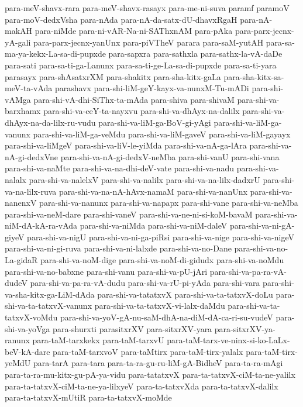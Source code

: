 {para-meV-shavx-rara
para-meV-shavx-rasayx
para-me-ni-suva
paramf
paramoV
para-moV-dedxVsha
para-nAda
para-nA-da-satx-dU-dhavxRgaH
para-nA-makAH
para-niMde
para-ni-vAR-Na-ni-SAThxnAM
para-pAka
para-parx-jecnx-yA-gali
para-parx-jecnx-yanUnx
para-piVTheV
parara
para-saM-yutAH
para-sa-ma-ya-kekx-La-sa-di-pupxde
para-sapxra
para-sathxla
para-sathx-la-vA-daDe
para-sati
para-sa-ti-ga-Lanunx
para-sa-ti-ge-La-sa-di-pupxde
para-sa-ti-yara
parasayx
para-shAsatxrXM
para-shakitx
para-sha-kitx-gaLa
para-sha-kitx-sa-meV-ta-vAda
parashavx
para-shi-liM-geY-kayx-va-nunxM-Tu-mADi
para-shi-vAMga
para-shi-vA-dhi-SiThx-ta-mAda
para-shiva
para-shivaM
para-shi-va-barxhamx
para-shi-va-ceY-ta-nayxvu
para-shi-va-dhAyx-na-dalilx
para-shi-va-dhAyx-na-da-lilx-ru-vudu
para-shi-va-liM-ga-BoV-gi-yAgi
para-shi-va-liM-ga-vanunx
para-shi-va-liM-ga-veMdu
para-shi-va-liM-gaveV
para-shi-va-liM-gayayx
para-shi-va-liMgeV
para-shi-va-liV-le-yiMda
para-shi-va-nA-ga-lAra
para-shi-va-nA-gi-dedxVne
para-shi-va-nA-gi-dedxV-neMba
para-shi-vanU
para-shi-vana
para-shi-va-naMte
para-shi-va-na-dhi-deV-vate
para-shi-va-nadu
para-shi-va-nalalx
para-shi-va-nalelxV
para-shi-va-nalilx
para-shi-va-na-lilx-dadxrU
para-shi-va-na-lilx-ruva
para-shi-va-na-nA-hAvx-namaM
para-shi-va-nanUnx
para-shi-va-nanenxV
para-shi-va-nanunx
para-shi-va-napapx
para-shi-vane
para-shi-va-neMba
para-shi-va-neM-dare
para-shi-vaneV
para-shi-va-ne-ni-si-koM-bavaM
para-shi-va-niM-dA-kA-ra-vAda
para-shi-va-niMda
para-shi-va-niM-daleV
para-shi-va-ni-gA-giyeV
para-shi-va-nigU
para-shi-va-ni-ga-piRsi
para-shi-va-nige
para-shi-va-nigeV
para-shi-va-ni-gi-ruva
para-shi-va-ni-lalxde
para-shi-va-no-Dane
para-shi-va-no-La-gidaR
para-shi-va-noM-dige
para-shi-va-noM-di-gidudx
para-shi-va-noMdu
para-shi-va-no-babxne
para-shi-vanu
para-shi-va-pU-jAri
para-shi-va-pa-ra-vA-dudeV
para-shi-va-pa-ra-vA-dudu
para-shi-va-rU-pi-yAda
para-shi-vara
para-shi-va-sha-kitx-ga-LiM-dAda
para-shi-va-tatatxvX
para-shi-va-ta-tatxvX-doLu
para-shi-va-ta-tatxvX-vanunx
para-shi-va-ta-tatxvX-vi-lalx-daMdu
para-shi-va-ta-tatxvX-voMdu
para-shi-va-yoV-gA-nu-saM-dhA-na-diM-dA-ca-ri-su-vudeV
para-shi-va-yoVga
para-shurxti
parasitxrXV
para-sitxrXV-yara
para-sitxrXV-ya-ranunx
para-taM-tarxkekx
para-taM-tarxvU
para-taM-tarx-ve-ninx-si-ko-LaLx-beV-kA-dare
para-taM-tarxvoV
para-taMtirx
para-taM-tirx-yalalx
para-taM-tirx-yeMdU
para-tarA
para-tara
para-ta-ra-gu-ru-liM-gA-BidheV
para-ta-ra-mAgi
para-ta-ra-mu-kitx-gu-pA-ya-vidu
para-tatatxvX
para-ta-tatxvX-ciM-ta-ne-yalilx
para-ta-tatxvX-ciM-ta-ne-ya-lilxyeV
para-ta-tatxvXda
para-ta-tatxvX-dalilx
para-ta-tatxvX-mUtiR
para-ta-tatxvX-moMde
}
